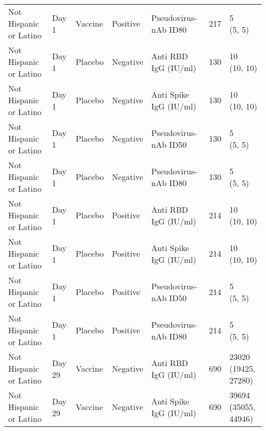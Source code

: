 \documentclass[]{book}
\theoremstyle{definition}
\theoremstyle{definition}
\theoremstyle{definition}
\newcommand{\1}{\mathbbm{1}}
\begin{document}
\begin{landscape}
\begin{ThreePartTable}
\begin{longtable}[t]{>{\raggedright\arraybackslash}p{7cm}llllll}
\hspace{1em}Not Hispanic or Latino & Day 1 & Vaccine & Positive & Pseudovirus-nAb ID80 & 217 & \makecell[l]{5\\(5, 5)}\\
\hspace{1em}Not Hispanic or Latino & Day 1 & Placebo & Negative & Anti RBD IgG (IU/ml) & 130 & \makecell[l]{10\\(10, 10)}\\
\hspace{1em}Not Hispanic or Latino & Day 1 & Placebo & Negative & Anti Spike IgG (IU/ml) & 130 & \makecell[l]{10\\(10, 10)}\\
\hspace{1em}Not Hispanic or Latino & Day 1 & Placebo & Negative & Pseudovirus-nAb ID50 & 130 & \makecell[l]{5\\(5, 5)}\\
\hspace{1em}Not Hispanic or Latino & Day 1 & Placebo & Negative & Pseudovirus-nAb ID80 & 130 & \makecell[l]{5\\(5, 5)}\\
\hspace{1em}Not Hispanic or Latino & Day 1 & Placebo & Positive & Anti RBD IgG (IU/ml) & 214 & \makecell[l]{10\\(10, 10)}\\
\hspace{1em}Not Hispanic or Latino & Day 1 & Placebo & Positive & Anti Spike IgG (IU/ml) & 214 & \makecell[l]{10\\(10, 10)}\\
\hspace{1em}Not Hispanic or Latino & Day 1 & Placebo & Positive & Pseudovirus-nAb ID50 & 214 & \makecell[l]{5\\(5, 5)}\\
\hspace{1em}Not Hispanic or Latino & Day 1 & Placebo & Positive & Pseudovirus-nAb ID80 & 214 & \makecell[l]{5\\(5, 5)}\\
\hspace{1em}Not Hispanic or Latino & Day 29 & Vaccine & Negative & Anti RBD IgG (IU/ml) & 690 & \makecell[l]{23020\\(19425, 27280)}\\
\hspace{1em}Not Hispanic or Latino & Day 29 & Vaccine & Negative & Anti Spike IgG (IU/ml) & 690 & \makecell[l]{39694\\(35055, 44946)}\\

\end{longtable}
\end{ThreePartTable}
\end{landscape}
\end{document}
